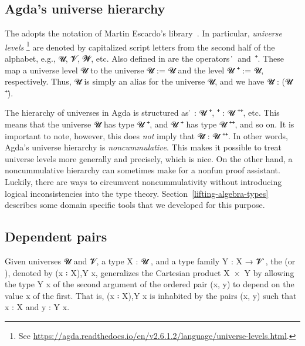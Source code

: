 \documentclass[a4paper,UKenglish,cleveref,autoref,thm-restate,11pt]{lipics-v2021}
\begin{document}
\subsection{Agda's universe hierarchy}\label{ssec:agdas-universe-hierarchy}
The \agdaualib adopts the notation of Martin Escardo's \typetopology library~\cite{MHE}. In particular, \emph{universe levels}%
\footnote{See \url{https://agda.readthedocs.io/en/v2.6.1.2/language/universe-levels.html}.}
are denoted by capitalized script letters from the second half of the alphabet, e.g., \ab 𝓤, \ab 𝓥, \ab 𝓦, etc.  Also defined in \typetopology are the operators~\af ̇~and~\af ⁺. These map a universe level \ab 𝓤 to the universe \ab 𝓤\af ̇ := \Set \ab 𝓤 and the level \ab 𝓤 \af ⁺ \aod := \lsuc \ab 𝓤, respectively.  Thus, \ab 𝓤\af ̇ is simply an alias for the universe \Set \ab 𝓤, and we have \ab 𝓤\af ̇ \as : (\ab 𝓤 \af ⁺)\af ̇.

The hierarchy of universes in Agda is structured as \af ̇ \as : \ab 𝓤 \af ⁺\af ̇, \hskip3mm
 \af ⁺\af ̇ \as : \ab 𝓤 \af ⁺\af ⁺\af ̇, etc. This means that the universe \ab 𝓤\af ̇ has type \ab 𝓤  \af ⁺\af ̇, and 𝓤 \af ⁺\af ̇ has type \ab 𝓤 \af ⁺\af ⁺\af ̇, and so on.  It is important to note, however, this does \emph{not} imply that \ab 𝓤\af ̇ \as : \ab 𝓤 \af ⁺\af ⁺\af ̇. In other words, Agda's universe hierarchy is \emph{noncummulative}. This makes it possible to treat universe levels more generally and precisely, which is nice. On the other hand, a noncummulative hierarchy can sometimes make for a nonfun proof assistant. Luckily, there are ways to circumvent noncummulativity without introducing logical inconsistencies into the type theory. Section~\ref{lifting-algebra-types} describes some domain specific tools that we developed for this purpose.








\subsection{Dependent pairs}\label{ssec:dependent-pairs}
Given universes \ab 𝓤 and \ab 𝓥, a type \ab X \as : \ab 𝓤 \aof ̇, and a type family \ab Y \as : X \as → \ab 𝓥 \aof ̇, the  (or ), denoted by (\ab x \as ꞉ \ab X)\as ,\ab Y \ab x, generalizes the Cartesian product \ab X~\as ×~\ab Y by allowing the type \ab Y \ab x of the second argument of the ordered pair (\ab x\as , \ab y) to depend on the value \ab x of the first.  That is, (\ab x \as ꞉ \ab X)\as ,\ab Y \ab x is inhabited by the pairs (\ab x\as , \ab y) such that \ab x \as : \ab X and \ab y \as : \ab Y \ab x.
\end{document}
